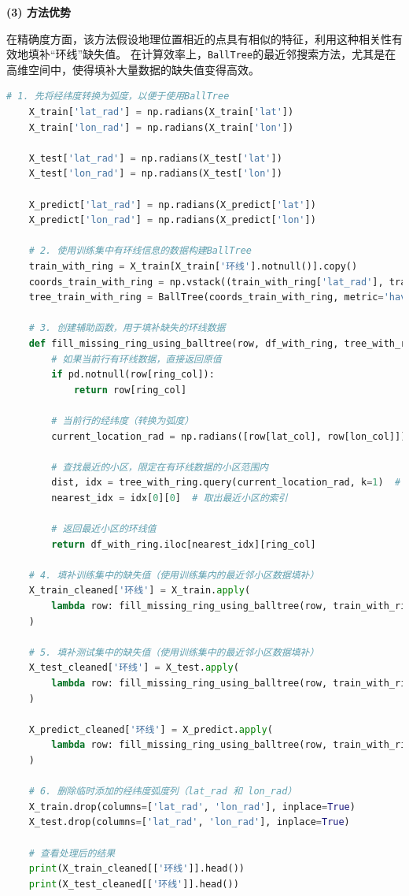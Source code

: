 \documentclass[
    report,     %
    oneside,    %
    UTF8,       %
    zihao=-4    %
]{config} %
\begin{document}
\textbf{(3) 方法优势}

在精确度方面，该方法假设地理位置相近的点具有相似的特征，利用这种相关性有效地填补“环线”缺失值。
在计算效率上，\lstinline|BallTree|的最近邻搜索方法，尤其是在高维空间中，使得填补大量数据的缺失值变得高效。

\newpage

\begin{lstlisting}[label=code:ring_processing, language=Python, caption=环线处理]
    # 1. 先将经纬度转换为弧度，以便于使用BallTree
    X_train['lat_rad'] = np.radians(X_train['lat'])
    X_train['lon_rad'] = np.radians(X_train['lon'])
    
    X_test['lat_rad'] = np.radians(X_test['lat'])
    X_test['lon_rad'] = np.radians(X_test['lon'])
    
    X_predict['lat_rad'] = np.radians(X_predict['lat'])
    X_predict['lon_rad'] = np.radians(X_predict['lon'])
    
    # 2. 使用训练集中有环线信息的数据构建BallTree
    train_with_ring = X_train[X_train['环线'].notnull()].copy()
    coords_train_with_ring = np.vstack((train_with_ring['lat_rad'], train_with_ring['lon_rad'])).T
    tree_train_with_ring = BallTree(coords_train_with_ring, metric='haversine')
    
    # 3. 创建辅助函数，用于填补缺失的环线数据
    def fill_missing_ring_using_balltree(row, df_with_ring, tree_with_ring, lat_col='lat', lon_col='lon', ring_col='环线'):
        # 如果当前行有环线数据，直接返回原值
        if pd.notnull(row[ring_col]):
            return row[ring_col]
        
        # 当前行的经纬度（转换为弧度）
        current_location_rad = np.radians([row[lat_col], row[lon_col]]).reshape(1, -1)
        
        # 查找最近的小区，限定在有环线数据的小区范围内
        dist, idx = tree_with_ring.query(current_location_rad, k=1)  # 只找一个最近的小区
        nearest_idx = idx[0][0]  # 取出最近小区的索引
        
        # 返回最近小区的环线值
        return df_with_ring.iloc[nearest_idx][ring_col]
    
    # 4. 填补训练集中的缺失值（使用训练集内的最近邻小区数据填补）
    X_train_cleaned['环线'] = X_train.apply(
        lambda row: fill_missing_ring_using_balltree(row, train_with_ring, tree_train_with_ring), axis=1
    )
    
    # 5. 填补测试集中的缺失值（使用训练集中的最近邻小区数据填补）
    X_test_cleaned['环线'] = X_test.apply(
        lambda row: fill_missing_ring_using_balltree(row, train_with_ring, tree_train_with_ring), axis=1
    )
    
    X_predict_cleaned['环线'] = X_predict.apply(
        lambda row: fill_missing_ring_using_balltree(row, train_with_ring, tree_train_with_ring), axis=1
    )
    
    # 6. 删除临时添加的经纬度弧度列（lat_rad 和 lon_rad）
    X_train.drop(columns=['lat_rad', 'lon_rad'], inplace=True)
    X_test.drop(columns=['lat_rad', 'lon_rad'], inplace=True)
    
    # 查看处理后的结果
    print(X_train_cleaned[['环线']].head())
    print(X_test_cleaned[['环线']].head())
\end{lstlisting}
\end{document}
